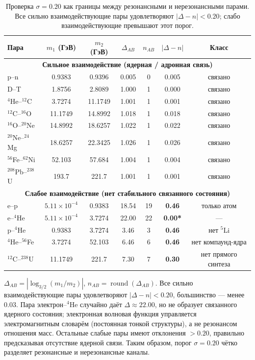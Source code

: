 \documentclass[11pt,a4paper]{article}
\theoremstyle{remark}
\begin{document}
	\begin{table}[H]
		\centering
		\caption{Проверка \(\sigma = 0.20\) как границы между резонансными и нерезонансными парами. Все сильно взаимодействующие пары удовлетворяют \(|\Delta-n| < 0.20\); слабо взаимодействующие превышают этот порог.}
		\label{tab:sigma_validation_heavy}
		\small
		\begin{tabular}{l c c c c c c}
			\toprule
			Пара & \(m_1\) (ГэВ) & \(m_2\) (ГэВ) & \(\Delta_{AB}\) & \(n_{AB}\) & \(|\Delta-n|\) & Класс \\
			\midrule
			\multicolumn{7}{c}{\textbf{Сильное взаимодействие (ядерная / адронная связь)}} \\
			p--n           & 0.9383 & 0.9396 & 0.005  & 0 & 0.005 & связано \\
			D--T           & 1.8756 & 2.8089 & 1.000  & 1 & 0.000 & связано \\
			$^4$He--$^{12}$C  & 3.7274 & 11.1749& 1.001  & 1 & 0.001 & связано \\
			$^{12}$C--$^{16}$O & 11.1749& 14.8992& 1.018  & 1 & 0.018 & связано \\
			$^{16}$O--$^{20}$Ne& 14.8992& 18.6257& 1.022  & 1 & 0.022 & связано \\
			$^{20}$Ne--$^{24}$Mg& 18.6257& 22.3425& 1.026  & 1 & 0.026 & связано \\
			$^{56}$Fe--$^{62}$Ni& 52.103 & 57.684 & 1.004  & 1 & 0.004 & связано \\
			$^{208}$Pb--$^{238}$U& 193.7  & 221.7  & 1.001  & 1 & 0.001 & связано \\
			\midrule
			\multicolumn{7}{c}{\textbf{Слабое взаимодействие (нет стабильного связанного состояния)}} \\
			e--p           & $5.11\times10^{-4}$ & 0.9383 & 18.54  & 19 & \textbf{0.46} & только атом \\
			e--$^4$He      & $5.11\times10^{-4}$ & 3.7274 & 22.00  & 22 & \textbf{0.00*} & — \\
			p--$^4$He      & 0.9383 & 3.7274 & 3.46   & 3  & \textbf{0.46} & нет $^5$Li \\
			$^4$He--$^{56}$Fe & 3.7274 & 52.103 & 6.46   & 6  & \textbf{0.46} & нет компаунд-ядра \\
			$^{12}$C--$^{238}$U& 11.1749& 221.7  & 7.30   & 7  & \textbf{0.30} & нет прямого синтеза \\
			\bottomrule
		\end{tabular}
		\par\smallskip
		\footnotesize
		\(\Delta_{AB} = |\log_{3/2}(m_1/m_2)|\), \(n_{AB} = \operatorname{round}(\Delta_{AB})\). Все сильно взаимодействующие пары удовлетворяют \(|\Delta-n| < 0.20\), большинство — менее \(0.03\). Пара электрон--$^4$He случайно даёт \(\Delta\approx22.00\), но не образует связанного ядерного состояния; электронная волновая функция управляется электромагнитным словарём (постоянная тонкой структуры), а не резонансом отношения масс. Остальные слабые пары имеют отклонения \(>0.20\), правильно предсказывая отсутствие ядерной связи. Таким образом, порог \(\sigma = 0.20\) чётко разделяет резонансные и нерезонансные каналы.
	\end{table}
	
\end{document}
